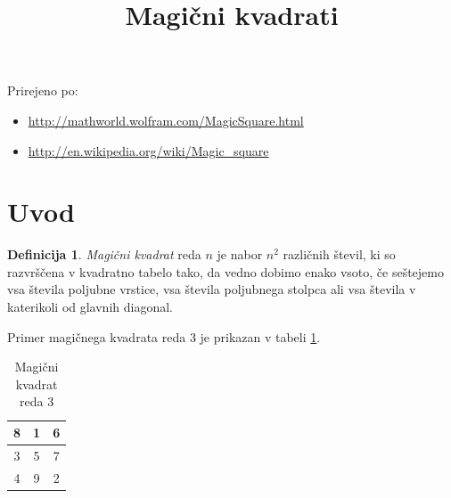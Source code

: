 \documentclass[a4paper,12pt]{article}
\title{Magični kvadrati}
\date{}
\theoremstyle{definition}
\newtheorem{definicija}{Definicija}
\theoremstyle{plain}
\begin{document}
\maketitle


Prirejeno po:

\begin{itemize}
   \item \url{http://mathworld.wolfram.com/MagicSquare.html}%
   \item \url{http://en.wikipedia.org/wiki/Magic_square}%
\end{itemize}

\tableofcontents



\newpage

\section{Uvod}

\begin{definicija}
   \emph{Magični kvadrat} reda \(n\) je nabor \(n^2\) različnih števil,
   ki so razvrščena v kvadratno tabelo tako, da vedno dobimo enako vsoto,
   če seštejemo vsa števila poljubne vrstice, vsa števila poljubnega
   stolpca ali vsa števila v katerikoli od glavnih diagonal.
\end{definicija}

Primer magičnega kvadrata reda 3 je prikazan v tabeli \ref{table:mag3}. %

\large
\begin{table}
   \centering
   \caption{Magični kvadrat reda 3}
   \label{table:mag3}
      \begin{tabular}{c|c|c}\toprule
      \midrule
       8 & 1 & 6 \\\hline
       3 & 5 & 7 \\\hline
       4 & 9 & 2 \\\hline
      \bottomrule
      \end{tabular}
\end{table}
\normalsize
\end{document}
